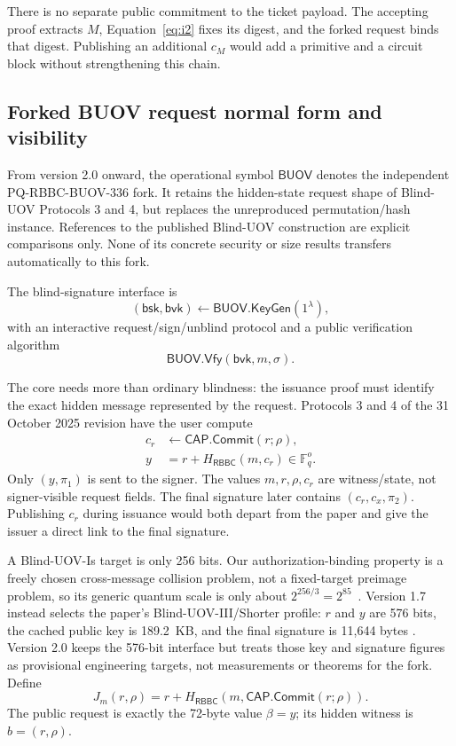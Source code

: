 \documentclass[11pt]{article}
\newcommand{\BUOV}{\mathsf{BUOV}}
\newcommand{\RBBC}{\mathsf{RBBC}}
\begin{document}
There is no separate public commitment to the ticket payload.  The accepting
proof extracts $M$, Equation~\eqref{eq:i2} fixes its digest, and the forked
request binds that digest.  Publishing an additional $c_M$ would add a primitive
and a circuit block without strengthening this chain.

\subsection{Forked BUOV request normal form and visibility}\label{sec:buov-normal}

From version 2.0 onward, the operational symbol $\BUOV$ denotes the independent
PQ-RBBC-BUOV-336 fork.  It retains the hidden-state request shape of
Blind-UOV Protocols 3 and 4, but replaces the unreproduced permutation/hash
instance.  References to the published Blind-UOV construction are explicit
comparisons only.  None of its concrete security or size results transfers
automatically to this fork.

The blind-signature interface is
\[
  (\mathsf{bsk},\mathsf{bvk})\leftarrow\BUOV.\mathsf{KeyGen}(1^\lambda),
\]
with an interactive request/sign/unblind protocol and a public verification
algorithm
\[
  \BUOV.\mathsf{Vfy}(\mathsf{bvk},m,\sigma).
\]

The core needs more than ordinary blindness: the issuance proof must identify
the exact hidden message represented by the request.  Protocols 3 and 4 of the
31 October 2025 revision have the user compute~\cite{blind-uov}
\begin{align}
 c_r&\leftarrow \mathsf{CAP.Commit}(r;\rho),
   \tag{B1}\label{eq:b1}\\
 y&=r+H_{\RBBC}(m,c_r)\in\mathbb F_q^o.
   \tag{B2}\label{eq:b2}
\end{align}
Only $(y,\pi_1)$ is sent to the signer.  The values $m,r,\rho,c_r$ are
witness/state, not signer-visible request fields.  The final signature later
contains $(c_r,c_x,\pi_2)$.  Publishing $c_r$ during issuance would both depart
from the paper and give the issuer a direct link to the final signature.

A Blind-UOV-Is target is only 256 bits.  Our authorization-binding property is
a freely chosen cross-message collision problem, not a fixed-target preimage
problem, so its generic quantum scale is only about
$2^{256/3}=2^{85}$~\cite{bht,compressed-oracle}.  Version 1.7 instead selects
the paper's Blind-UOV-III/Shorter profile: $r$ and $y$ are 576 bits, the cached
public key is 189.2~KB, and the final signature is 11,644 bytes
\cite{blind-uov}.  Version 2.0 keeps the 576-bit interface but treats those
key and signature figures as provisional engineering targets, not measurements
or theorems for the fork.  Define
\[
 J_m(r,\rho)=r+H_{\RBBC}
   (m,\mathsf{CAP.Commit}(r;\rho)).
\]
The public request is exactly the 72-byte value $\beta=y$; its hidden witness
is $b=(r,\rho)$.
\end{document}
